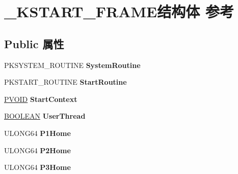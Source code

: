 \hypertarget{struct___k_s_t_a_r_t___f_r_a_m_e}{}\section{\+\_\+\+K\+S\+T\+A\+R\+T\+\_\+\+F\+R\+A\+M\+E结构体 参考}
\label{struct___k_s_t_a_r_t___f_r_a_m_e}
\subsection*{Public 属性}
\begin{DoxyCompactItemize}
\item 
\mbox{\label{struct___k_s_t_a_r_t___f_r_a_m_e_a15b2c25cebc96b6e54a6aa67878a223b}} 
P\+K\+S\+Y\+S\+T\+E\+M\+\_\+\+R\+O\+U\+T\+I\+NE {\bfseries System\+Routine}
\item 
\mbox{\label{struct___k_s_t_a_r_t___f_r_a_m_e_acf42b1619465ef2d415578ab46628f37}} 
P\+K\+S\+T\+A\+R\+T\+\_\+\+R\+O\+U\+T\+I\+NE {\bfseries Start\+Routine}
\item 
\mbox{\label{struct___k_s_t_a_r_t___f_r_a_m_e_a6fdadd118e56154c9a68239021fdff28}} 
\hyperlink{interfacevoid}{P\+V\+O\+ID} {\bfseries Start\+Context}
\item 
\mbox{\label{struct___k_s_t_a_r_t___f_r_a_m_e_ae045c785c92fc9c5a5d0f88aa2cda464}} 
\hyperlink{_processor_bind_8h_a112e3146cb38b6ee95e64d85842e380a}{B\+O\+O\+L\+E\+AN} {\bfseries User\+Thread}
\item 
\mbox{\label{struct___k_s_t_a_r_t___f_r_a_m_e_a54fae802a7d1bef4f757989909596e0c}} 
U\+L\+O\+N\+G64 {\bfseries P1\+Home}
\item 
\mbox{\label{struct___k_s_t_a_r_t___f_r_a_m_e_a2a00e343b8ff4e9a385a7ae4a2a62399}} 
U\+L\+O\+N\+G64 {\bfseries P2\+Home}
\item 
\mbox{\label{struct___k_s_t_a_r_t___f_r_a_m_e_acbbbec7d1bc559b3726a95886dff9318}} 
U\+L\+O\+N\+G64 {\bfseries P3\+Home}
\item 

\end{DoxyCompactItemize}
